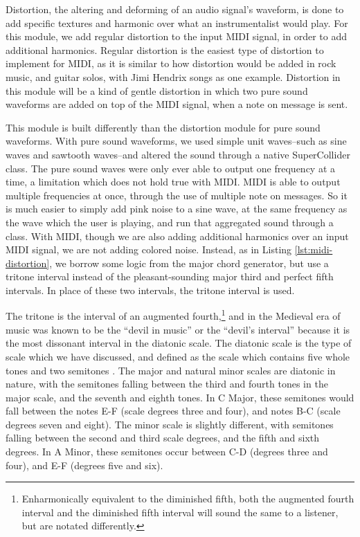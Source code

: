 Distortion, the altering and deforming of an audio signal's waveform, is done to add specific textures and harmonic over what an instrumentalist would play. For this module, we add regular distortion to the input MIDI signal, in order to add additional harmonics. Regular distortion is the easiest type of distortion to implement for MIDI, as it is similar to how distortion would be added in rock music, and guitar solos, with Jimi Hendrix songs as one example. Distortion in this module will be a kind of gentle distortion in which two pure sound waveforms are added on top of the MIDI signal, when a note on message is sent. 

This module is built differently than the distortion module for pure sound waveforms. With pure sound waveforms, we used simple unit waves--such as sine waves and sawtooth waves--and altered the sound through a native SuperCollider class. The pure sound waves were only ever able to output one frequency at a time, a limitation which does not hold true with MIDI. MIDI is able to output multiple frequencies at once, through the use of multiple note on messages. So it is much easier to simply add pink noise to a sine wave, at the same frequency as the wave which the user is playing, and run that aggregated sound through a class. With MIDI, though we are also adding additional harmonics over an input MIDI signal, we are not adding colored noise. Instead, as in Listing \ref{lst:midi-distortion}, we borrow some logic from the major chord generator, but use a tritone interval instead of the pleasant-sounding major third and perfect fifth intervals. In place of these two intervals, the tritone interval is used. 

The tritone is the interval of an augmented fourth,\footnote{Enharmonically equivalent to the diminished fifth, both the augmented fourth interval and the diminished fifth interval will sound the same to a listener, but are notated differently.} and in the Medieval era of music was known to be the ``devil in music'' or the ``devil's interval'' because it is the most dissonant interval in the diatonic scale. The diatonic scale is the type of scale which we have discussed, and defined as the scale which contains five whole tones and two semitones \cite{Burkholder_Grout_Palisca_2014}. The major and natural minor scales are diatonic in nature, with the semitones falling between the third and fourth tones in the major scale, and the seventh and eighth tones. In C Major, these semitones would fall between the notes E-F (scale degrees three and four), and notes B-C (scale degrees seven and eight). The minor scale is slightly different, with semitones falling between the second and third scale degrees, and the fifth and sixth degrees. In A Minor, these semitones occur between C-D (degrees three and four), and E-F (degrees five and six).

